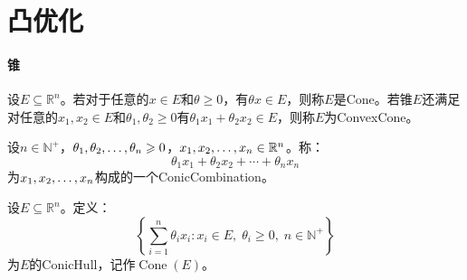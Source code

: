 \chapter{凸优化}




\subsubsection{锥}
\begin{definition}
	设$E\subseteq\mathbb{R}^{n}$。若对于任意的$x\in E$和$\theta\geqslant0$，有$\theta x\in E$，则称$E$是\gls{Cone}。若锥$E$还满足对任意的$x_1,x_2\in E$和$\theta_1,\theta_2\geqslant0$有$\theta_1x_1+\theta_2x_2\in E$，则称$E$为\gls{ConvexCone}。
\end{definition}
\begin{definition}
	设$n\in\mathbb{N}^+$，$\theta_1, \theta_2, \dots, \theta_{n}\geqslant0$，$x_1, x_2, \dots, x_{n}\in\mathbb{R}^{n}$。称：
	\begin{equation*}
		\theta_1x_1+\theta_2x_2+\cdots+\theta_nx_n
	\end{equation*}
	为$x_1, x_2, \dots, x_{n}$构成的一个\gls{ConicCombination}。
\end{definition}
\begin{definition}
	设$E\subseteq\mathbb{R}^{n}$。定义：
	\begin{equation*}
		\left\{\sum_{i=1}^{n}\theta_ix_i:x_i\in E,\;\theta_i\geqslant0,\;n\in\mathbb{N}^+\right\}
	\end{equation*}
	为$E$的\gls{ConicHull}，记作$\operatorname{Cone}(E)$。
\end{definition}
